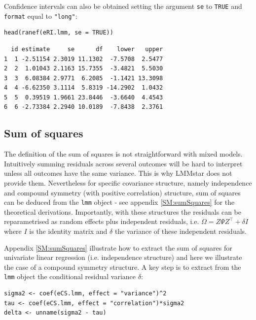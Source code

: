 \documentclass[12pt]{article}
\newcommand\Warning[1][3ex]{%
\renewcommand\stacktype{L}%
\scaleto{\stackon[1.3pt]{\color{red}$\triangle$}{\tiny\bfseries !}}{#1}%
\xspace
}
\newcommand\trans[1]{{#1}^\intercal}%
\begin{document}
Confidence intervals can also be obtained setting the argument \texttt{se} to
\texttt{TRUE} and \texttt{format} equal to \texttt{"long"}:
\lstset{language=r,label= ,caption= ,captionpos=b,numbers=none}
\begin{lstlisting}
head(ranef(eRI.lmm, se = TRUE))
\end{lstlisting}

\begin{verbatim}
  id estimate     se      df    lower   upper
1  1 -2.51154 2.3019 11.1302  -7.5708  2.5477
2  2  1.01043 2.1163 15.7355  -3.4821  5.5030
3  3  6.08384 2.9771  6.2085  -1.1421 13.3098
4  4 -6.62350 3.1114  5.8319 -14.2902  1.0432
5  5  0.39519 1.9661 23.8446  -3.6640  4.4543
6  6 -2.73384 2.2940 10.0189  -7.8438  2.3761
\end{verbatim}


\clearpage

\subsection{Sum of squares}
\label{sec:org6c55814}

\Warning The definition of the sum of squares is not straightforward with mixed
models. Intuitively summing residuals across several outcomes will be
hard to interpret unless all outcomes have the same variance. This is
why LMMstar does not provide them. Nevertheless for specific
covariance structure, namely independence and compound symmetry (with
positive correlation) structure, sum of squares can be deduced from
the \texttt{lmm} object - see appendix \ref{SM:sumSquares} for the theoretical
derivations. Importantly, with these structures the residuals can be
reparametrised as random effects plus independent residuals,
i.e. \(\Omega = Z \Psi \trans{Z} + \delta I\) where \(I\) is the
identity matrix and \(\delta\) the variance of these independent
residuals.

\bigskip

Appendix \ref{SM:sumSquares} illustrate how to extract the sum of squares
for univariate linear regression (i.e. independence structure) and
here we illustrate the case of a compound symmetry structure.  A key
step is to extract from the \texttt{lmm} object the conditional residual variance
\(\delta\):
\lstset{language=r,label= ,caption= ,captionpos=b,numbers=none}
\begin{lstlisting}
sigma2 <- coef(eCS.lmm, effect = "variance")^2
tau <- coef(eCS.lmm, effect = "correlation")*sigma2
delta <- unname(sigma2 - tau)
\end{lstlisting}
\end{document}
